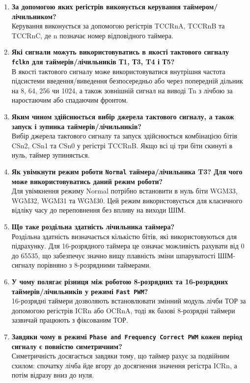 \documentclass[14pt, a4paper]{extreport}
\begin{document}
\begin{enumerate}
		\item \textbf{За допомогою яких регістрів виконується керування таймером/лічильником?} \\ Керування виконується за допомогою регістрів TCCRnA, TCCRnB та TCCRnC, де n позначає номер відповідного таймера.
		
		\item \textbf{Які сигнали можуть використовуватись в якості тактового сигналу \texttt{fclkn} для таймерів/лічильників Т1, Т3, T4 і Т5?} \\ В якості тактового сигналу може використовуватися внутрішня частота підсистеми введення/виведення безпосередньо або через попередній дільник на 8, 64, 256 чи 1024, а також зовнішній сигнал на виводі Tn з лічбою за наростаючим або спадаючим фронтом.
		
		\item \textbf{Яким чином здійснюється вибір джерела тактового сигналу, а також запуск і зупинка таймерів/лічильників?} \\ Вибір джерела тактового сигналу та запуск здійснюється комбінацією бітів CSn2, CSn1 та CSn0 у регістрі TCCRnB. Якщо всі ці три біти скинуті в нуль, таймер зупиняється.
		
		\item \textbf{Як увімкнути режим роботи \texttt{Normal} таймера/лічильника T3? Для чого може використовуватись даний режим роботи?} \\ Для увімкнення режиму Normal потрібно встановити в нуль біти WGM33, WGM32, WGM31 та WGM30. Цей режим використовується для класичного відліку часу до переповнення без впливу на виходи ШІМ.
		
		\item \textbf{Що таке роздільна здатність лічильника таймера?} \\ Роздільна здатність визначається кількістю бітів, які використовуються для підрахунку. Для 16-розрядного таймера це означає можливість рахувати від 0 до 65535, що забезпечує значно вищу плавність зміни шпаруватості ШІМ-сигналу порівняно з 8-розрядними таймерами.
		
		\item \textbf{У чому полягає різниця між роботою 8-розрядних та 16-розрядних таймерів/лічильників у режимі \texttt{Fast PWM}?} \\ 16-розрядні таймери дозволяють встановлювати змінний модуль лічби ТОР за допомогою регістрів ICRn або OCRnA, тоді як базові 8-розрядні таймери зазвичай працюють з фіксованим ТОР.
		
		\item \textbf{Завдяки чому в режимі \texttt{Phase and Frequency Correct PWM} кожен період сигналу є повністю симетричним?} \\ Симетричність досягається завдяки тому, що таймер рахує за подвійним схилом: спочатку лічба йде вгору до досягнення значення регістра ICRn, а потім відразу вниз до нуля.
		

\end{enumerate}
\end{document}
